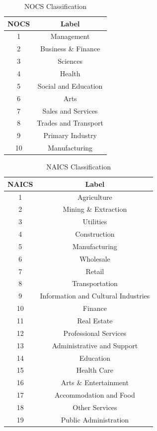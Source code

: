 \documentclass[12pt]{article}
\begin{document}
\begin{table}[h]
\centering
\caption{NOCS Classification}
\label{tab:nocs-names}
\begin{tabular}{@{}cc@{}}
\toprule
\textbf{NOCS} & \textbf{Label} \\ \midrule
1 & Management \\
2 & Business \& Finance \\
3 & Sciences \\
4 & Health \\
5 & Social and Education \\
6 & Arts \\
7 & Sales and Services \\
8 & Trades and Transport \\
9 & Primary Industry \\
10 & Manufacturing \\
\bottomrule
\end{tabular}
\end{table}

\begin{table}[h]
\centering
\caption{NAICS Classification}
\label{tab:naics-names}
\begin{tabular}{@{}cc@{}}
\toprule
\textbf{NAICS} & \textbf{Label} \\ \midrule
1  & Agriculture \\
2  & Mining \& Extraction \\
3  & Utilities \\
4  & Construction \\
5  & Manufacturing \\
6  & Wholesale \\
7  & Retail \\
8  & Transportation \\
9  & Information and Cultural Industries \\
10 & Finance \\
11 & Real Estate \\
12 & Professional Services \\
13 & Administrative and Support \\
14 & Education \\
15 & Health Care \\
16 & Arts \& Entertainment \\
17 & Accommodation and Food \\
18 & Other Services \\
19 & Public Administration \\ 
\bottomrule
\end{tabular}
\end{table}
\end{document}
